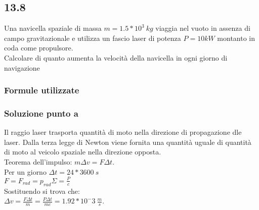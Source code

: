 \documentclass[../../main.tex]{subfiles}
\begin{document}
\subsection*{13.8}
Una navicella spaziale di massa $m = 1.5 * 10^3\ kg$ viaggia nel vuoto in assenza di campo gravitazionale e utilizza un fascio laser di potenza $P = 10kW$ montanto in coda come propulsore.\\
Calcolare di quanto aumenta la velocità della navicella in ogni giorno di navigazione
\subsubsection*{Formule utilizzate}
\subsubsection*{Soluzione punto a}
Il raggio laser trasporta quantità di moto nella direzione di propagazione dle laser. Dalla terza legge di Newton viene fornita una quantità uguale di quantità di moto al veicolo spaziale nella direzione opposta.\\
Teorema dell'impulso: $m\Delta v = F\Delta t$.\\
Per un giorno $\Delta t = 24 * 3600\ s$\\
$F = F_{rad} = p_{rad}\Sigma = \frac{P}{c}$\\
Sostituendo si trova che:\\
$\Delta v = \frac{F\Delta t}{m} = \frac{P\Delta t}{mc} = 1.92 * 10^-3\ \frac{m}{s}$.

\newpage
\end{document}
